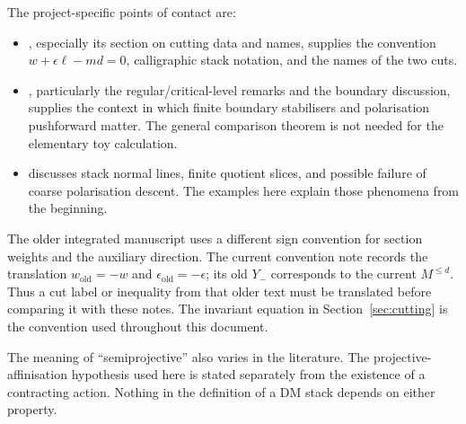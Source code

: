 \documentclass[11pt,a4paper]{article}
\numberwithin{equation}{section}
\theoremstyle{definition}
\begin{document}
The project-specific points of contact are:
\begin{itemize}
\item {}, especially its section on
cutting data and names, supplies the convention
$w+\epsilon\ell-md=0$, calligraphic stack notation, and the names of
the two cuts.
\item {}, particularly the
regular/critical-level remarks and the boundary discussion, supplies
the context in which finite boundary stabilisers and polarisation
pushforward matter. The general comparison theorem is not needed for
the elementary toy calculation.
\item {} discusses
stack normal lines, finite quotient slices, and possible failure of
coarse polarisation descent. The examples here explain those phenomena
from the beginning.
\end{itemize}

The older integrated manuscript uses a different sign convention for
section weights and the auxiliary direction. The current convention
note records the translation $w_{\mathrm{old}}=-w$ and
$\epsilon_{\mathrm{old}}=-\epsilon$; its old $Y_-$ corresponds to the
current $M^{\le d}$. Thus a cut label or inequality from that older text
must be translated before comparing it with these notes. The invariant
equation in Section~\ref{sec:cutting} is the convention used throughout
this document.

The meaning of ``semiprojective'' also varies in the literature. The
projective-affinisation hypothesis used here is stated separately from
the existence of a contracting action. Nothing in the definition of a
DM stack depends on either property.
\end{document}
